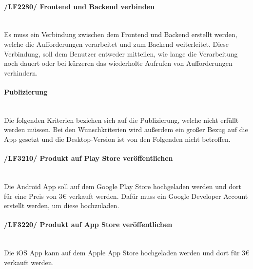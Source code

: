 \begin{indentE}
	\paragraph{/LF2280/ Frontend und Backend verbinden}\mbox{}\\
	Es muss ein Verbindung zwischen dem Frontend und Backend erstellt werden, welche die Aufforderungen verarbeitet und zum Backend weiterleitet. Diese Verbindung, soll dem Benutzer entweder mitteilen, wie lange die Verarbeitung noch dauert oder bei kürzeren das wiederholte Aufrufen von Aufforderungen verhindern.
	\paragraph{Publizierung}\mbox{}\\
	Die folgenden Kriterien beziehen sich auf die Publizierung, welche nicht erfüllt werden müssen. Bei den Wunschkriterien wird außerdem ein großer Bezug auf die App gesetzt und die Desktop-Version ist von den Folgenden nicht betroffen.
	\paragraph{/LF3210/ Produkt auf Play Store veröffentlichen}\mbox{}\\
	Die Android App soll auf dem Google Play Store hochgeladen werden und dort für eine Preis von 3€ verkauft werden. Dafür muss ein Google Developer Account erstellt werden, um diese hochzuladen.
	\paragraph{/LF3220/ Produkt auf App Store veröffentlichen}\mbox{}\\
	Die iOS App kann auf dem Apple App Store hochgeladen werden und dort für 3€ verkauft werden.
\end{indentE}\\
